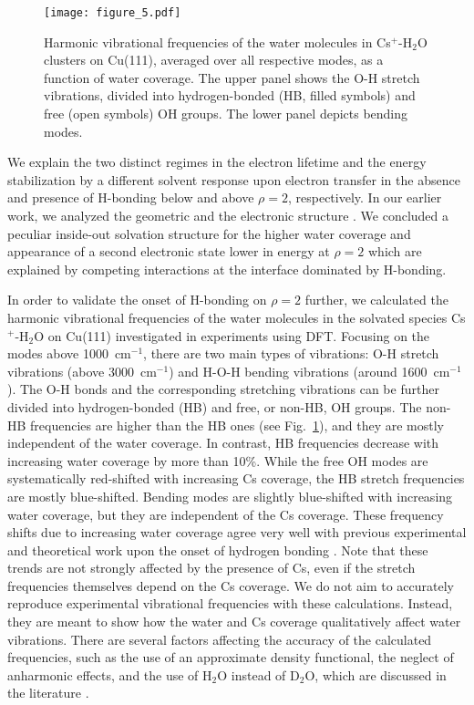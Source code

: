 \documentclass[aps,twocolumn,amssymb,amsfonts,amsmath,showpacs,final,a4paper,superscriptaddress]{revtex4-2}
\begin{document}
\begin{figure}[h]
\centering
\texttt{[image: figure\_5.pdf]}
    \caption{Harmonic vibrational frequencies of the water molecules in Cs$^+$-H$_2$O clusters on Cu(111), averaged over all respective modes, as a function of water coverage. The upper panel shows the O-H stretch vibrations, divided into hydrogen-bonded (HB, filled symbols) and free (open symbols) OH groups. The lower panel depicts bending modes.}
    \label{fig:fig-t}
\end{figure}

We explain the two distinct regimes in the electron lifetime and the energy stabilization by a different solvent response upon electron transfer in the absence and presence of H-bonding below and above $\rho=2$, respectively. In our earlier work, we analyzed the geometric and the electronic structure \cite{penschke_2023}. We concluded a peculiar inside-out solvation structure for the higher water coverage and appearance of a second electronic state lower in energy at $\rho=2$ which are explained by competing interactions at the interface dominated by H-bonding.

In order to validate the onset of H-bonding on $\rho=2$ further, we calculated the harmonic vibrational frequencies of the water molecules in the solvated species  Cs$^+$-H$_2$O on Cu(111) investigated in experiments using DFT. Focusing on the modes above 1000~cm$^{-1}$, there are two main types of vibrations: O-H stretch vibrations (above 3000~cm$^{-1}$) and H-O-H bending vibrations (around 1600~cm$^{-1}$). The O-H bonds and the corresponding stretching vibrations can be further divided into hydrogen-bonded (HB) and free, or non-HB, OH groups. The non-HB frequencies are higher than the HB ones (see Fig.~\ref{fig:fig-t}), and they are mostly independent of the water coverage. In contrast, HB frequencies decrease with increasing water coverage by more than 10\%. While the free OH modes are systematically red-shifted with increasing Cs coverage, the HB stretch frequencies are mostly blue-shifted. Bending modes are slightly blue-shifted with increasing water coverage, but they are independent of the Cs coverage. These frequency shifts due to increasing water coverage agree very well with previous experimental and theoretical work upon the onset of hydrogen bonding \cite{Nibbering_2007,dunn_2006}. Note that these trends are not strongly affected by the presence of Cs, even if the stretch frequencies themselves depend on the Cs coverage. We do not aim to accurately reproduce experimental vibrational frequencies with these calculations. Instead, they are meant to show how the water and Cs coverage qualitatively affect water vibrations. There are several factors affecting the accuracy of the calculated frequencies, such as the use of an approximate density functional, the neglect of anharmonic effects, and the use of H$_2$O instead of D$_2$O, which are discussed in the literature \cite{dunn_2006,kesharwani_2015,ceriotti_2016}.
\end{document}

